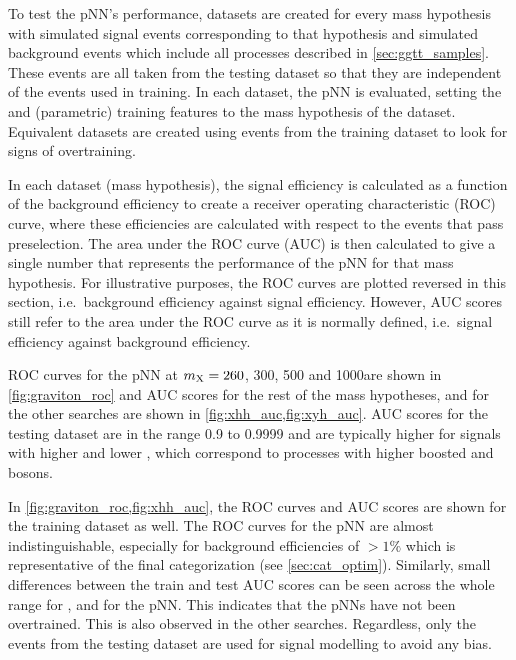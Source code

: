 To test the pNN's performance, datasets are created for every mass hypothesis with simulated signal events corresponding to that hypothesis and simulated background events which include all processes described in \cref{sec:ggtt_samples}. These events are all taken from the testing dataset so that they are independent of the events used in training. In each dataset, the pNN is evaluated, setting the \mX and \mY (parametric) training features to the mass hypothesis of the dataset. Equivalent datasets are created using events from the training dataset to look for signs of overtraining.

In each dataset (mass hypothesis), the signal efficiency is calculated as a function of the background efficiency to create a receiver operating characteristic (ROC) curve, where these efficiencies are calculated with respect to the events that pass preselection. The area under the ROC curve (AUC) is then calculated to give a single number that represents the performance of the pNN for that mass hypothesis. For illustrative purposes, the ROC curves are plotted reversed in this section, i.e.\ background efficiency against signal efficiency. However, AUC scores still refer to the area under the ROC curve as it is normally defined, i.e.\ signal efficiency against background efficiency.  

ROC curves for the \XTwoHH pNN at $m_{\mathrm{X}}=260$, 300, 500 and 1000\GeV are shown in \cref{fig:graviton_roc} and AUC scores for the rest of the mass hypotheses, and for the other searches are shown in \cref{fig:xhh_auc,fig:xyh_auc}. AUC scores for the testing dataset are in the range 0.9 to 0.9999 and are typically higher for signals with higher \mX and lower \mY, which correspond to processes with higher boosted \PH and \PY bosons.

In \cref{fig:graviton_roc,fig:xhh_auc}, the ROC curves and AUC scores are shown for the training dataset as well. The ROC curves for the \XTwoHH pNN are almost indistinguishable, especially for background efficiencies of $>1\%$ which is representative of the final categorization (see \cref{sec:cat_optim}). Similarly, small differences between the train and test AUC scores can be seen across the whole \mX range for \XTwoHH, and for the \XZeroHH pNN. This indicates that the pNNs have not been overtrained. This is also observed in the other searches. Regardless, only the events from the testing dataset are used for signal modelling to avoid any bias.

